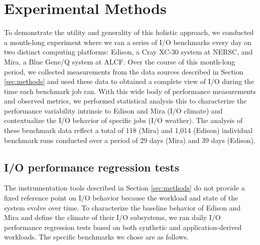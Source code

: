 \section{Experimental Methods} \label{sec:platforms}

To demonstrate the utility and generality of this holistic approach, we conducted a month-long experiment where we ran a series of I/O benchmarks every day on two distinct computing platforms:
Edison, a Cray XC-30 system at NERSC, and Mira, a Blue Gene/Q system at ALCF.
Over the course of this month-long period, we collected measurements from the data sources described in Section \ref{sec:methods} and used these data to
obtained a complete view of I/O during the time each benchmark job ran.
With this wide body of performance measurements and observed metrics, we performed statistical analysis this to characterize the performance variability intrinsic to Edison and Mira (I/O climate) and contextualize the I/O behavior of specific jobs (I/O weather).
The analysis of these benchmark data reflect a total of 118 (Mira) and 1,014 (Edison) individual benchmark runs conducted over a period of 29 days (Mira) and 39 days (Edison).

\subsection{I/O performance regression tests} \label{sec:methods/tests}

The instrumentation tools described in Section \ref{sec:methods} do not provide a fixed reference point on I/O behavior because
the workload and state of the system evolve over time.
To characterize the baseline behavior of Edison and Mira and define the climate of their I/O subsystems, we ran daily I/O performance regression tests based on both synthetic and application-derived workloads.
The specific benchmarks we chose are as follows.

